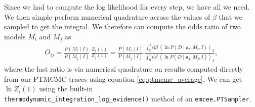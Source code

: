Since we had to compute the log likelihood for every step, we have all
we need.  We then simple perform numerical quadrature across the
values of $\beta$ that we sampled to get the integral.  We therefore
can compute the odds ratio of two models $M_i$ and $M_j$ as
\begin{align}
O_{ij} = \frac{P(M_i\mid I)}{P(M_j\mid I)}\,\frac{Z_i(1)}{Z_j(1)}
= \frac{P(M_i\mid I)}{P(M_j\mid I)}\,\frac{\int_0^1\mathrm{d}\beta\,\left\langle \ln P(D\mid \mathbf{a}_i, M_i, I)\right\rangle_\beta}{\int_0^1\mathrm{d}\beta\,\left\langle \ln P(D\mid \mathbf{a}_j, M_j, I)\right\rangle_\beta},
\end{align}
where the last ratio is via numerical quadrature on results computed
directly from our PTMCMC traces using equation
\eqref{eq:ptmcmc_average}.  We can get $\ln Z_i(1)$ using the built-in\\
\verb|thermodynamic_integration_log_evidence()| method of an
\texttt{emcee.PTSampler}.
